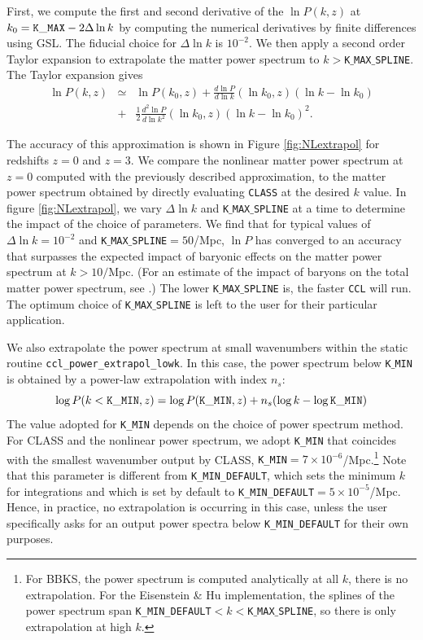 \documentclass[\docopts]{\docclass}
\newcommand{\ccl}{{\tt CCL}\xspace}
\begin{document}
First, we compute the first and second derivative of the $\ln P(k,z)$ at $k_0={\rm \tt K\_MAX}-2\Delta\ln k$ by computing the numerical derivatives by finite differences using GSL. The fiducial choice for $\Delta\ln k$ is $10^{-2}$. We then apply a second order Taylor expansion to extrapolate the matter power spectrum to $k>${\tt K$\_$MAX$\_$SPLINE}. The Taylor expansion gives
%
\begin{eqnarray}
  \ln P(k,z) &\simeq& \ln P(k_0,z) + \frac{d\ln P}{d\ln k}(\ln k_0,z) (\ln k-\ln k_0)  \nonumber\\
  &+& \frac{1}{2}  \frac{d^2\ln P}{d\ln k^2}(\ln k_0,z) (\ln k-\ln k_0)^2.
  \label{eq:NLPSTaylor}
\end{eqnarray}

The accuracy of this approximation is shown in Figure \ref{fig:NLextrapol} for redshifts $z=0$ and $z=3$. We compare the nonlinear matter power spectrum at $z=0$ computed with the previously described approximation, to the matter power spectrum obtained by directly evaluating {\tt CLASS} at the desired $k$ value. In figure \ref{fig:NLextrapol}, we vary $\Delta \ln k$ and {\tt K$\_$MAX$\_$SPLINE} at a time to determine the impact of the choice of parameters. We find that for typical values of $\Delta \ln k=10^{-2}$ and {\tt K$\_$MAX$\_$SPLINE}$=50$/Mpc, $\ln P$ has converged to an accuracy that surpasses the expected impact of baryonic effects on the matter power spectrum at $k>10/$Mpc.  (For an estimate of the impact of baryons on the total matter power spectrum, see \citealt{Schneider15}.) The lower {\tt K$\_$MAX$\_$SPLINE} is, the faster \ccl will run. The optimum choice of {\tt K$\_$MAX$\_$SPLINE} is left to the user for their particular application.

We also extrapolate the power spectrum at small wavenumbers within the static routine {\tt ccl\_power\_extrapol\_lowk}. In this case, the power spectrum below {\tt K$\_$MIN} is obtained by a power-law extrapolation with index $n_s$:
\begin{equation}
  \log P(k<{\tt K\_MIN},z) = \log P({\tt K\_MIN},z) + n_s (\log k-\log{\tt K\_MIN})
\end{equation}
The value adopted for {\tt K\_MIN} depends on the choice of power spectrum method. For CLASS and the nonlinear power spectrum, we adopt {\tt K\_MIN} that coincides with the smallest wavenumber output by CLASS, {\tt K\_MIN}$=7\times 10^{-6}$/Mpc.\footnote{For BBKS, the power spectrum is computed analytically at all $k$, there is no extrapolation. For the Eisenstein \& Hu implementation, the splines of the power spectrum span {\tt K\_MIN\_DEFAULT}$<k<${\tt K$\_$MAX$\_$SPLINE}, so there is only extrapolation at high $k$.} Note that this parameter is different from {\tt K\_MIN\_DEFAULT}, which sets the minimum $k$ for integrations and which is set by default to {\tt K\_MIN\_DEFAULT}$=5\times 10^{-5}$/Mpc. Hence, in practice, no extrapolation is occurring in this case, unless the user specifically asks for an output power spectra below {\tt K\_MIN\_DEFAULT} for their own purposes.
\end{document}

